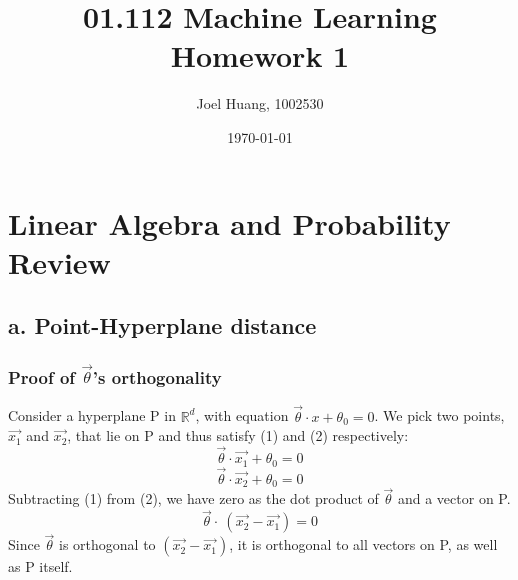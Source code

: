 \documentclass[9pt,twocolumn]{article}
\title{
	01.112 Machine Learning\\
	Homework 1
}
\author{Joel Huang, 1002530}
\date{\today}
\begin{document}
\maketitle

\section{Linear Algebra and Probability Review}
	\subsection*{a. Point-Hyperplane distance}
		\subsubsection*{Proof of $\vec{\theta}$'s orthogonality}
			Consider a hyperplane P in $\mathbb{R}^{d}$, with equation $\vec{\theta}\cdot x + \theta_{0}=0$.
			We pick two points, $\vec{x_1}$ and $\vec{x_2}$, that lie on P and thus satisfy (1) and (2)
			respectively:
			\begin{equation}
			\vec{\theta}\cdot\vec{x_1}+\theta_0 = 0
			\end{equation}
			\begin{equation}
			\vec{\theta}\cdot\vec{x_2}+\theta_0 = 0
			\end{equation}
			Subtracting (1) from (2), we have zero as the dot product of $\vec{\theta}$ and a vector on P.
			\begin{equation}
			\vec{\theta}\cdot\ (\vec{x_2}-\vec{x_1}) = 0
			\end{equation}
			Since $\vec{\theta}$ is orthogonal to $(\vec{x_2}-\vec{x_1})$, it is orthogonal to all vectors on P,
			as well as P itself.
\end{document}

